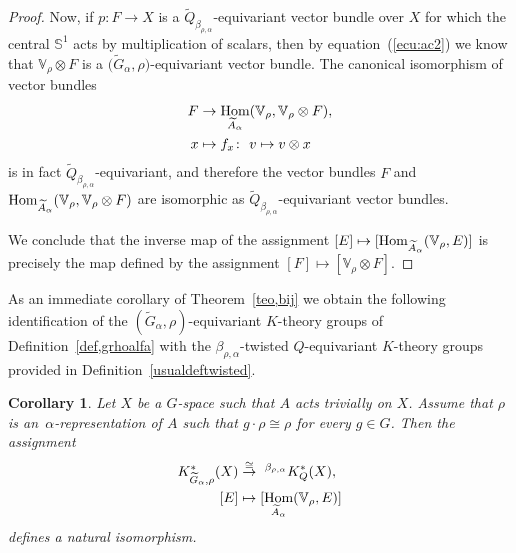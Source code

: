 \documentclass[pdftex]{sigma}
\def\S{\mathbb{S}}
\def\V{\mathbb{V}}
\DeclareMathOperator{\Hom}{\textup{Hom}}
\newtheorem{Cor}[Th]{Corollary}
\theoremstyle{definition}
\numberwithin{equation}{section}
\begin{document}
\begin{proof}
Now, if $p\colon F\rightarrow X$ is a
$\widetilde{Q}_{\beta_{\rho,\alpha}}$-equivariant vector bundle over $X$
for which the central $\S^{1}$ acts by multiplication of
scalars, then by equation~(\ref{ecu:ac2}) we know that
$\V_{\rho}\otimes F$ is a
$\big(\widetilde{G}_{\alpha},\rho\big)$-equivariant vector bundle.
The canonical isomorphism of vector bundles
\begin{align*}
F&\rightarrow \Hom_{\widetilde{A}_{\alpha}}(
\V_{\rho}, \V_{\rho}\otimes F),
\\
x&\mapsto f_{x}\colon\ v\mapsto v\otimes x
\end{align*}
is in fact $\widetilde{Q}_{\beta_{\rho,\alpha}}$-equivariant, and therefore the vector
bundles $F$ and
$\Hom_{\widetilde{A}_{\alpha}}(\V_{\rho},\V_{\rho}\otimes
F)$ are isomorphic as
$\widetilde{Q}_{\beta_{\rho,\alpha}}$-equivariant vector bundles.
	
We conclude that the inverse map of the assignment
$[E]\mapsto[\Hom_{\widetilde{A}_{\alpha}}(\V_{\rho},E)]$
is precisely the map defined by the assignment $[F]\mapsto
[\V_{\rho}\otimes F]$.
\end{proof}


As an immediate corollary of Theorem~\ref{teo,bij} we obtain the following
identification of the $(\widetilde{G}_{\alpha}, \rho)$-equivariant $K$-theory groups of
Definition~\ref{def,grhoalfa} with the $\beta_{\rho,\alpha}$-twisted $Q$-equivariant
$K$-theory groups provided in Definition~\ref{usualdeftwisted}.

\begin{Cor}\label{identification}
Let $X$ be a $G$-space such that $A$ acts trivially on $X$. Assume that
$\rho$ is an~$\alpha$-re\-p\-resentation of $A$ such that
$g\cdot \rho\cong \rho$ for every $g\in G$. Then the assignment
\begin{align*}
K^{\ast}_{\widetilde{G}_{\alpha}, \rho}(X)
&\stackrel{\cong}{\rightarrow} \ ^{\beta_{\rho,\alpha}}K^{\ast}_{Q}(X),
\\
[E]&\mapsto [\Hom_{\widetilde{A}_{\alpha}}(\V_{\rho},E)]
\end{align*}
defines a natural isomorphism.
\end{Cor}
\end{document}
